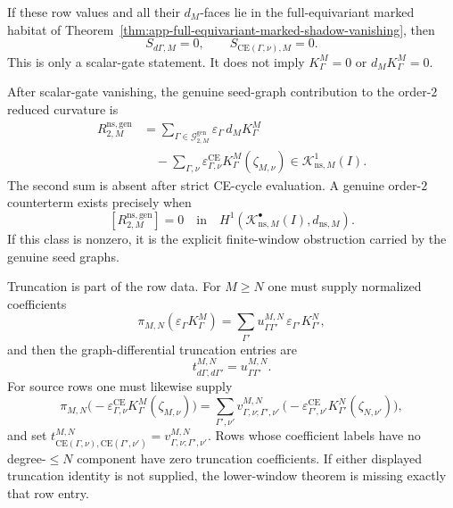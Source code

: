 \begin{prop}
  If these row values and all their \(d_M\)-faces lie in the
  full-equivariant marked habitat of
  Theorem~\ref{thm:app-full-equivariant-marked-shadow-vanishing}, then
  \[
    S_{d\Gamma,M}=0,
    \qquad
    S_{\mathrm{CE}(\Gamma,\nu),M}=0.
  \]
  This is only a scalar-gate statement.  It does not imply
  \(K^M_\Gamma=0\) or \(d_M K^M_\Gamma=0\).

  After scalar-gate vanishing, the genuine seed-graph contribution to the
  order-\(2\) reduced curvature is
  \[
  \begin{aligned}
    R^{\mathrm{ns,gen}}_{2,M}
      &=
      \sum_{\Gamma\in\mathcal G^{\mathrm{gen}}_{2,M}}
        \varepsilon_\Gamma\,d_M K^M_\Gamma
      \\
      &\quad -
      \sum_{\Gamma,\nu}
        \varepsilon^{\mathrm{CE}}_{\Gamma,\nu}
        K^M_\Gamma(\zeta_{M,\nu})
      \in
      \mathcal K^1_{\mathrm{ns},M}(I).
  \end{aligned}
  \]
  The second sum is absent after strict CE-cycle evaluation.  A genuine
  order-\(2\) counterterm exists precisely when
  \[
    [R^{\mathrm{ns,gen}}_{2,M}]
      =
    0
    \quad\text{in}\quad
    H^1(\mathcal K^\bullet_{\mathrm{ns},M}(I),d_{\mathrm{ns},M}).
  \]
  If this class is nonzero, it is the explicit finite-window obstruction
  carried by the genuine seed graphs.

  Truncation is part of the row data.  For \(M\geq N\) one must supply
  normalized coefficients
  \[
    \pi_{M,N}(\varepsilon_\Gamma K^M_\Gamma)
      =
    \sum_{\Gamma'}
      u^{M,N}_{\Gamma\Gamma'}\,\varepsilon_{\Gamma'}K^N_{\Gamma'},
  \]
  and then the graph-differential truncation entries are
  \[
    t^{M,N}_{d\Gamma,d\Gamma'}=u^{M,N}_{\Gamma\Gamma'}.
  \]
  For source rows one must likewise supply
  \[
    \pi_{M,N}
      \bigl(
        -\varepsilon^{\mathrm{CE}}_{\Gamma,\nu}
        K^M_\Gamma(\zeta_{M,\nu})
      \bigr)
      =
    \sum_{\Gamma',\nu'}
      v^{M,N}_{\Gamma,\nu;\Gamma',\nu'}\,
      \bigl(
        -\varepsilon^{\mathrm{CE}}_{\Gamma',\nu'}
        K^N_{\Gamma'}(\zeta_{N,\nu'})
      \bigr),
  \]
  and set
  \(t^{M,N}_{\mathrm{CE}(\Gamma,\nu),\mathrm{CE}(\Gamma',\nu')}=
  v^{M,N}_{\Gamma,\nu;\Gamma',\nu'}\).  Rows whose coefficient labels have
  no degree-\(\leq N\) component have zero truncation coefficients.  If
  either displayed truncation identity is not supplied, the lower-window
  theorem is missing exactly that row entry.


\end{prop}
